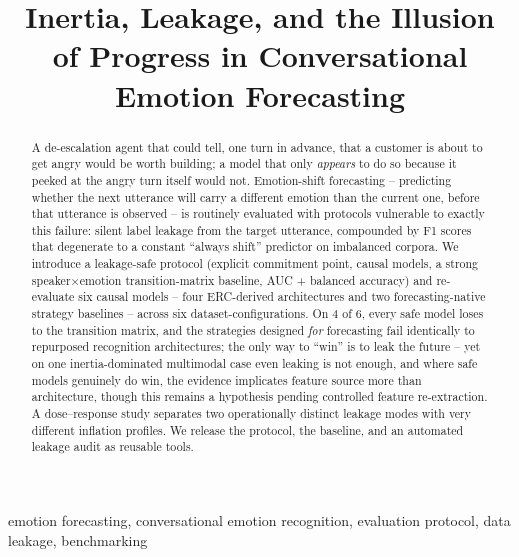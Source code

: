 \documentclass[conference]{IEEEtran}
\begin{document}
\title{Inertia, Leakage, and the Illusion of Progress in Conversational Emotion Forecasting}

\author{
}

\maketitle

\begin{abstract}
A de-escalation agent that could tell, one turn in advance, that a customer is about to get angry
would be worth building; a model that only \emph{appears} to do so because it peeked at the angry
turn itself would not. Emotion-shift forecasting -- predicting whether the next utterance will
carry a different emotion than the current one, before that utterance is observed -- is routinely
evaluated with protocols vulnerable to exactly this failure: silent label leakage from the target
utterance, compounded by F1 scores that degenerate to a constant ``always shift'' predictor on
imbalanced corpora. We introduce a leakage-safe protocol (explicit commitment point, causal models,
a strong speaker$\times$emotion transition-matrix baseline, AUC + balanced accuracy) and
re-evaluate six causal models -- four ERC-derived architectures and two forecasting-native strategy
baselines -- across six dataset-configurations. On 4 of 6, every safe model loses to the transition
matrix, and the strategies designed \emph{for} forecasting fail identically to
repurposed recognition architectures; the only way to ``win'' is to leak the future -- yet on one
inertia-dominated multimodal case even leaking is not enough, and where safe models genuinely do
win, the evidence implicates feature source more than architecture, though this remains a
hypothesis pending controlled feature re-extraction. A dose--response study separates
two operationally distinct leakage modes with very different inflation profiles. We release the
protocol, the baseline, and an automated leakage audit as reusable tools.
\end{abstract}

\begin{IEEEkeywords}
emotion forecasting, conversational emotion recognition, evaluation protocol, data leakage, benchmarking
\end{IEEEkeywords}
\end{document}

